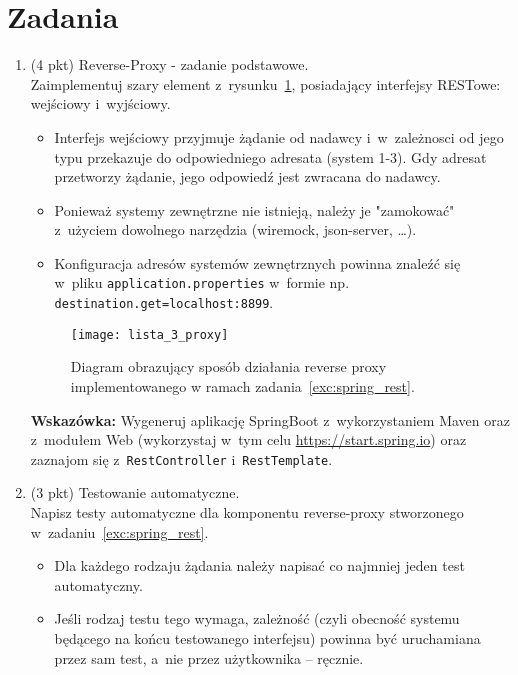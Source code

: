 \documentclass[12pt]{article}
\begin{document}
    \section*{Zadania}
    \begin{enumerate}
        \item\label{exc:spring_rest}
            (4 pkt) Reverse-Proxy - zadanie podstawowe.\\
            Zaimplementuj szary element z~rysunku~\ref{fig:lista_3_proxy}, posiadający interfejsy RESTowe: wejściowy i~wyjściowy.
            \begin{itemize}
                \item Interfejs wejściowy przyjmuje żądanie od nadawcy i~w~zależnosci od jego typu przekazuje do odpowiedniego adresata (system 1-3). Gdy adresat przetworzy żądanie, jego odpowiedź jest zwracana do nadawcy.
                \item Ponieważ systemy zewnętrzne nie istnieją, należy je "zamokować" z~użyciem dowolnego narzędzia (wiremock, json-server, \ldots).
                \item Konfiguracja adresów systemów zewnętrznych powinna znaleźć się w~pliku \texttt{applica\-tion.pro\-per\-ties} w~formie np. \texttt{destination.get=localhost:8899}.
            \end{itemize}
            
            \begin{figure}[ht]
                \centering
                \texttt{[image: lista\_3\_proxy]}
                \caption{Diagram obrazujący sposób działania reverse proxy implementowanego w ramach zadania~\ref{exc:spring_rest}.}
                \label{fig:lista_3_proxy}
            \end{figure}

            \textbf{Wskazówka:} Wygeneruj aplikację SpringBoot z~wykorzystaniem Maven oraz z~modułem Web (wykorzystaj w~tym celu \url{https://start.spring.io}) oraz zaznajom się z~\texttt{RestController} i~\texttt{RestTemplate}.

        \item\label{exc:spring_rest_test}
            (3 pkt) Testowanie automatyczne.\\
            Napisz testy automatyczne dla komponentu reverse-proxy stworzonego w~zadaniu~\ref{exc:spring_rest}.
            \begin{itemize}
                \item Dla każdego rodzaju żądania należy napisać co najmniej jeden test automatyczny.
                \item Jeśli rodzaj testu tego wymaga, zależność (czyli obecność systemu będącego na końcu testowanego interfejsu) powinna być uruchamiana przez sam test, a~nie przez użytkownika -- ręcznie.
            \end{itemize}


\end{enumerate}
\end{document}
